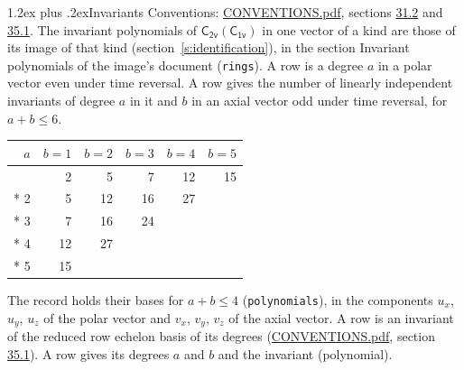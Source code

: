 \documentclass[10pt,a4paper]{article}
\makeatletter
\renewcommand\section{\@startsection{section}{1}{\z@}{-3ex plus -1ex minus -.2ex}%
  {1.2ex plus .2ex}{\normalfont\large\sffamily\bfseries\color{parttitle}}}
\numberwithin{equation}{section}
\newcommand{\grp}[1]{\mathsf{#1}}
\makeatother
\begin{document}
\section{Invariants}\label{s:invariants}
Conventions: \href{../../CONVENTIONS.pdf}{CONVENTIONS.pdf}, sections \href{../../CONVENTIONS.pdf\#conv.31.2}{31.2} and \href{../../CONVENTIONS.pdf\#conv.35.1}{35.1}.
The invariant polynomials of $\grp{C_{2v}}(\grp{C_{1v}})$ in one vector of a kind are those of its image of that kind (section~\ref{s:identification}), in the section Invariant polynomials of the image's document (\texttt{rings}).
\leavevmode\label{n:index.degree.polar}\label{n:index.degree.axial}A row is a degree $a$ in a polar vector even under time reversal. A row gives the number of linearly independent invariants of degree $a$ in it and $b$ in an axial vector odd under time reversal, for $a + b \le 6$.
{\small\begin{longtable}{@{}rrrrrr@{}}\toprule
$a$ & $b = 1$ & $b = 2$ & $b = 3$ & $b = 4$ & $b = 5$\\\midrule\endhead
\bottomrule\endfoot\endlastfoot
1 & 2 & 5 & 7 & 12 & 15\\*
2 & 5 & 12 & 16 & 27 & \\*
3 & 7 & 16 & 24 &  & \\*
4 & 12 & 27 &  &  & \\*
5 & 15 &  &  &  & \\
\bottomrule\end{longtable}}
\leavevmode\label{n:local.component.polar}\label{n:local.component.axial}The record holds their bases for $a + b \le 4$ (\texttt{polynomials}), in the components $u_{x}$, $u_{y}$, $u_{z}$ of the polar vector and $v_{x}$, $v_{y}$, $v_{z}$ of the axial vector. \label{n:head.polynomial}A row is an invariant of the reduced row echelon basis of its degrees (\href{../../CONVENTIONS.pdf}{CONVENTIONS.pdf}, section \href{../../CONVENTIONS.pdf\#conv.35.1}{35.1}). A row gives its degrees $a$ and $b$ and the invariant (polynomial).
\end{document}
